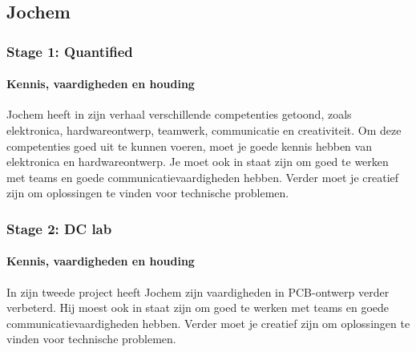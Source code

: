 \subsection{Jochem} 
\subsubsection{Stage 1: Quantified} \paragraph{Kennis, vaardigheden en houding} 
Jochem heeft in zijn verhaal verschillende competenties getoond, zoals elektronica, hardwareontwerp, teamwerk, communicatie en creativiteit. Om deze competenties goed uit te kunnen voeren, moet je goede kennis hebben van elektronica en hardwareontwerp. Je moet ook in staat zijn om goed te werken met teams en goede communicatievaardigheden hebben. Verder moet je creatief zijn om oplossingen te vinden voor technische problemen.


\subsubsection{Stage 2: DC lab} \paragraph{Kennis, vaardigheden en houding} 
In zijn tweede project heeft Jochem zijn vaardigheden in PCB-ontwerp verder verbeterd. Hij moest ook in staat zijn om goed te werken met teams en goede communicatievaardigheden hebben. Verder moet je creatief zijn om oplossingen te vinden voor technische problemen.


